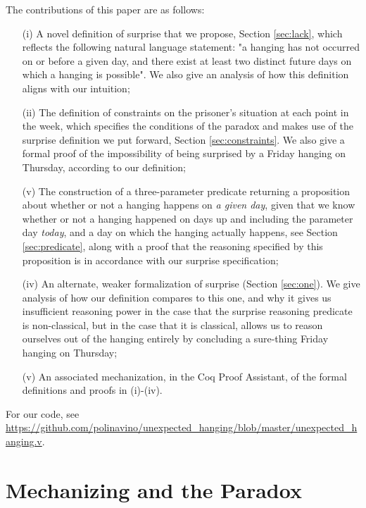 \documentclass[runningheads]{llncs}
\begin{document}
  The contributions of this paper are as follows:

  \begin{itemize}
    \item[(i)] A novel definition of surprise that we propose,
    Section \ref{sec:lack}, which reflects
    the following natural language statement: "a hanging has not occurred on or before a given day,
    and there exist at least two distinct future days on which a hanging
    is possible". We
    also give an analysis of how this definition aligns with our intuition;

    \item[(ii)] The definition of constraints on the prisoner's situation at each
    point in the week, which specifies the conditions of the paradox and makes use
    of the surprise definition we put forward, Section \ref{sec:constraints}. We also
    give a formal proof of the impossibility of being surprised by a Friday hanging
    on Thursday, according to our definition;

    \item[(v)] The construction of a three-parameter predicate returning a proposition about
    whether or not a hanging happens on \emph{a given day}, given that we know whether or not a hanging
    happened on days up and including the parameter day \emph{today}, and a day on which the hanging
    actually happens, see Section \ref{sec:predicate}, along with a proof that the reasoning specified by
    this proposition is in accordance with our surprise specification;

    \item[(iv)] An alternate, weaker formalization of surprise (Section \ref{sec:one}). We give analysis of how
    our definition compares to this one, and why it gives us insufficient reasoning
    power in the case that the surprise reasoning predicate is non-classical, but
    in the case that it is classical, allows us to reason ourselves out of the hanging entirely by concluding
    a sure-thing Friday hanging on Thursday;

    \item[(v)] An associated mechanization, in the Coq Proof Assistant, of the formal
    definitions and proofs in (i)-(iv).
  \end{itemize}

  For our code, see \url{https://github.com/polinavino/unexpected_hanging/blob/master/unexpected_hanging.v}.

\section{Mechanizing and the Paradox}
\label{sec:form}
\end{document}
